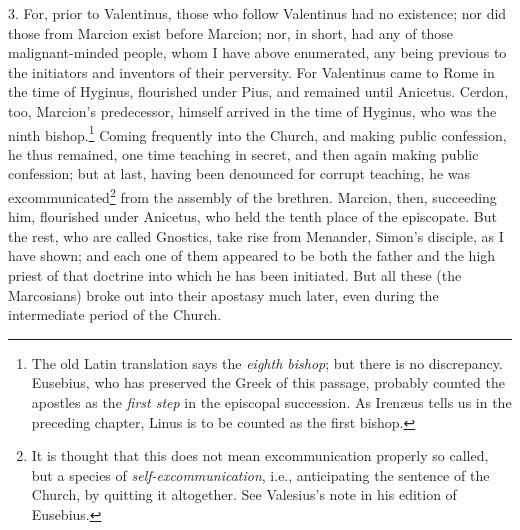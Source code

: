 3. For, prior to Valentinus, those who follow Valentinus had no existence; nor did those from Marcion exist before Marcion; nor, in short, had any of those malignant-minded people, whom I have above enumerated, any being previous to the initiators and inventors of their perversity. For Valentinus came to Rome in the time of Hyginus, flourished under Pius, and remained until Anicetus. Cerdon, too, Marcion’s predecessor, himself arrived in the time of Hyginus, who was the ninth bishop.\footnote{The old Latin translation says the \emph{eighth bishop}; but there is no discrepancy. Eusebius, who has preserved the Greek of this passage, probably counted the apostles as the \emph{first step} in the episcopal succession. As Irenæus tells us in the preceding chapter, Linus is to be counted as the first bishop.} Coming frequently into the Church, and making public confession, he thus remained, one time teaching in secret, and then again making public confession; but at last, having been denounced for corrupt teaching, he was excommunicated\footnote{It is thought that this does not mean excommunication properly so called, but a species of \emph{self-excommunication}, i.e., anticipating the sentence of the Church, by quitting it altogether. See Valesius’s note in his edition of Eusebius.} from the assembly of the brethren. Marcion, then, succeeding him, flourished under Anicetus, who held the tenth place of the episcopate. But the rest, who are called Gnostics, take rise from Menander, Simon’s disciple, as I have shown; and each one of them appeared to be both the father and the high priest of that doctrine into which he has been initiated. But all these (the Marcosians) broke out into their apostasy much later, even during the intermediate period of the Church.


